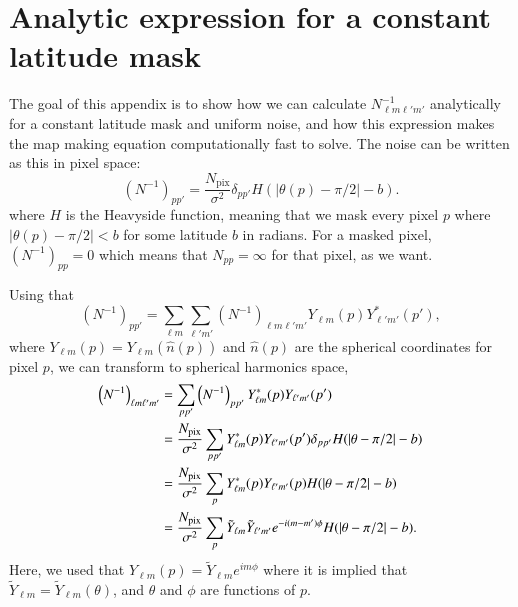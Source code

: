 \documentclass[twocolumn]{../common/aa}
\begin{document}


\appendix

\section{Analytic expression for a constant latitude mask}
\label{sec:appendixA}


The goal of this appendix is to show how we can calculate $N_{\ell m \ell' m'}^{-1}$ analytically for a constant latitude mask and uniform noise, and how this expression makes the map making equation computationally fast to solve. The noise can be written as this in pixel space:
$$
\left(N^{-1} \right)_{pp'} = \frac{N_{\mathrm{pix}}}{\sigma^2} \delta_{pp'} H(|\theta(p) -\pi/2|-b).
$$
where $H$ is the Heavyside function, meaning that we mask every pixel $p$ where $|\theta(p) -\pi/2| < b$ for some latitude $b$ in radians. For a masked pixel, $\left(N^{-1} \right)_{pp}=0$ which means that $N_{pp} = \infty$ for that pixel, as we want.

Using that
$$
\left(N^{-1}\right)_{pp'} = \sum_{\ell m}\sum_{\ell' m'} \left(N^{-1}\right)_{\ell m \ell'm'} Y_{\ell m}\left(p\right)Y^*_{\ell' m'}\left(p'\right),
$$
where $Y_{\ell m}\left(p\right) = Y_{\ell m}\left(\hat{n}(p)\right)$ and $\hat{n}(p)$ are the spherical coordinates for pixel $p$, we can transform to spherical harmonics space,
\begin{align}
\nonumber
\left(N^{-1}\right)_{\ell m \ell' m'} &= \sum_{p p'}\left(N^{-1}\right)_{pp'}Y^{*}_{\ell m}(p)Y_{\ell' m'}(p')\\
\nonumber
&= \frac{N_{\mathrm{pix}}}{\sigma^2}\sum_{p p'} Y^{*}_{\ell m}(p)Y_{\ell' m'}(p') \delta_{pp'} H(|\theta -\pi/2|-b)\\
\nonumber
&= \frac{N_{\mathrm{pix}}}{\sigma^2}\sum_{p } Y^{*}_{\ell m}(p)Y_{\ell' m'}(p) H(|\theta -\pi/2|-b)\\
&= \frac{N_{\mathrm{pix}}}{\sigma^2}\sum_p \Tilde{Y}_{\ell m}\Tilde{Y}_{\ell' m'} e^{-i(m-m')\phi} H(|\theta -\pi/2|-b).
\end{align}
Here, we used that $Y_{\ell m}(p) = \tilde{Y}_{\ell m} e^{im\phi}$ where it is implied that $\tilde{Y}_{\ell m}=\tilde{Y}_{\ell m}(\theta)$, and $\theta$ and $\phi$ are functions of $p$.
\end{document}
